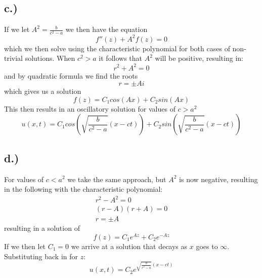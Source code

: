 \documentclass{article}
\begin{document}
\subsection*{c.)}
If we let $A^2 = \frac{b}{c^2 -a}$ we then have the equation
\begin{equation}
f''(z) + A^2f(z) = 0
\end{equation}
which we then solve using the characteristic polynomial for both cases of non-trivial solutions. When $c^2 > a$ it follows that $A^2$ will be positive, resulting in:
\begin{equation}
r^2 + A^2 = 0
\end{equation}
and by quadratic formula we find the roots
\begin{equation}
r = \pm Ai
\end{equation}
which gives us a solution 
\begin{equation}
f(z) = C_1cos(Ax) + C_2sin(Ax)
\end{equation}
This then results in an oscillatory solution for values of $c > a^2$
\begin{equation}
u(x, t) = C_1cos(\sqrt{\frac{b}{c^2 - a}}(x - ct)) + C_2sin(\sqrt{\frac{b}{c^2 - a}}(x - ct))
\end{equation}
\subsection*{d.)}
For values of $c<a^2$ we take the same approach, but $A^2$ is now negative, resulting in the following with the characteristic polynomial:
\begin{equation}
\begin{aligned}
r^2 - A^2 = 0\\
(r - A)(r + A) = 0\\
r = \pm A
\end{aligned}
\end{equation}
resulting in a solution of
\begin{equation}
f(z) = C_1e^{Az} + C_2e^{-Az}
\end{equation}
If we then let $C_1 = 0$ we arrive at a solution that decays as $x$ goes to $\infty$. Substituting back in for $z$:
\begin{equation}
u(x,t) = C_2e^{\sqrt{\frac{b}{c^2 - a}}(x-ct)}
\end{equation}
\end{document}
